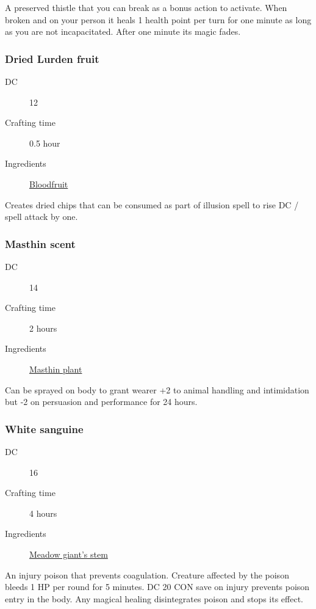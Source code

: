 A preserved thistle that you can break as a bonus action to activate. 
When broken and on your person it heals 1 health point per turn for one minute 
as long as you are not incapacitated. After one minute its magic fades.

\subsubsection{Dried Lurden fruit}
\label{Dried Lurden fruit}

\begin{description}
\item [DC] 12
\item [Crafting time] 0.5 hour
\item [Ingredients] \hyperref[Luurden]{Bloodfruit}
\end{description}

Creates dried chips that can be consumed as part of illusion spell to rise DC / spell attack by one.

\subsubsection{Masthin scent}
\label{Masthin scent}

\begin{description}
\item [DC] 14
\item [Crafting time] 2 hours
\item [Ingredients] \hyperref[Masthin]{Masthin plant}
\end{description}

Can be sprayed on body to grant wearer +2 to animal handling and intimidation 
but -2 on persuasion and performance for 24 hours.

\subsubsection{White sanguine}
\label{White sanguine}

\begin{description}
\item [DC] 16
\item [Crafting time] 4 hours
\item [Ingredients] \hyperref[Meadow Giant]{Meadow giant's stem}
\end{description}

An injury poison that prevents coagulation. Creature affected by the poison bleeds 
1 HP per round for 5 minutes. DC 20 CON save on injury prevents poison entry in the body. 
Any magical healing disintegrates poison and stops its effect.

